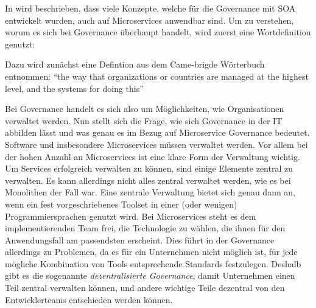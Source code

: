 In  wird beschrieben, dass viele Konzepte, welche für die Governance mit \ac{SOA} entwickelt wurden, auch auf Microservices anwendbar sind. Um zu verstehen, worum es sich bei Governance überhaupt handelt, wird zuerst eine Wortdefinition genutzt:

\begin{definition}[Governance] Dazu wird zunächst eine Defintion aus dem Came-brigde Wörterbuch entnommen:
	\enquote{the way that organizations or countries are managed at the highest level, and the systems for doing this}\autocite{camebdrigeGovernance}
\end{definition}

Bei Governance handelt es sich also um Möglichkeiten, wie Organisationen verwaltet werden. Nun stellt sich die Frage, wie sich Governance in der IT abbilden lässt und was genau es im Bezug auf Microservice Governance bedeutet. Software und insbesondere Microservices müssen verwaltet werden. Vor allem bei der hohen Anzahl an Microservices ist eine klare Form der Verwaltung wichtig. Um Services erfolgreich verwalten zu können, sind einige Elemente zentral zu verwalten. Es kann allerdings nicht alles zentral verwaltet werden, wie es bei Monolithen der Fall war. Eine zentrale Verwaltung bietet sich genau dann an, wenn ein fest vorgeschriebenes Toolset in einer (oder wenigen) Programmiersprachen genutzt wird. Bei Microservices steht es dem implementierenden Team frei, die Technologie zu wählen, die ihnen für den Anwendungsfall am passendsten erscheint. Dies führt in der Governance allerdings zu Problemen, da es für ein Unternehmen nicht möglich ist, für jede mögliche Kombination von Tools entsprechende Standards festzulegen. Deshalb gibt es die sogenannte \textit{dezentralisierte Governance}, damit Unternehmen einen Teil zentral verwalten können, und andere wichtige Teile dezentral von den Entwicklerteams entschieden werden können\autocite[Kapitel 2]{di2017research}.

